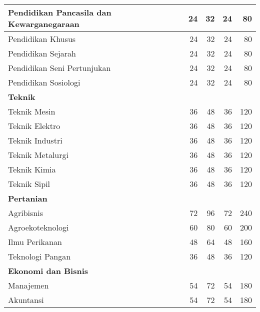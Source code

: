 \documentclass[
]{book}
\begin{document}
\begin{table}[H]
{\begin{tabular}{l|r|r|r|r}
\hline
\hspace{1em}Pendidikan Pancasila dan Kewarganegaraan & 24 & 32 & 24 & 80\\
\hline
\hspace{1em}Pendidikan Khusus & 24 & 32 & 24 & 80\\
\hline
\hspace{1em}Pendidikan Sejarah & 24 & 32 & 24 & 80\\
\hline
\hspace{1em}Pendidikan Seni Pertunjukan & 24 & 32 & 24 & 80\\
\hline
\hspace{1em}Pendidikan Sosiologi & 24 & 32 & 24 & 80\\
\hline
\multicolumn{5}{l}{\textbf{Teknik}}\\
\hline
\hspace{1em}Teknik Mesin & 36 & 48 & 36 & 120\\
\hline
\hspace{1em}Teknik Elektro & 36 & 48 & 36 & 120\\
\hline
\hspace{1em}Teknik Industri & 36 & 48 & 36 & 120\\
\hline
\hspace{1em}Teknik Metalurgi & 36 & 48 & 36 & 120\\
\hline
\hspace{1em}Teknik Kimia & 36 & 48 & 36 & 120\\
\hline
\hspace{1em}Teknik Sipil & 36 & 48 & 36 & 120\\
\hline
\multicolumn{5}{l}{\textbf{Pertanian}}\\
\hline
\hspace{1em}Agribisnis & 72 & 96 & 72 & 240\\
\hline
\hspace{1em}Agroekoteknologi & 60 & 80 & 60 & 200\\
\hline
\hspace{1em}Ilmu Perikanan & 48 & 64 & 48 & 160\\
\hline
\hspace{1em}Teknologi Pangan & 36 & 48 & 36 & 120\\
\hline
\multicolumn{5}{l}{\textbf{Ekonomi dan Bisnis}}\\
\hline
\hspace{1em}Manajemen & 54 & 72 & 54 & 180\\
\hline
\hspace{1em}Akuntansi & 54 & 72 & 54 & 180\\

\end{tabular}}
\end{table}
\end{document}
